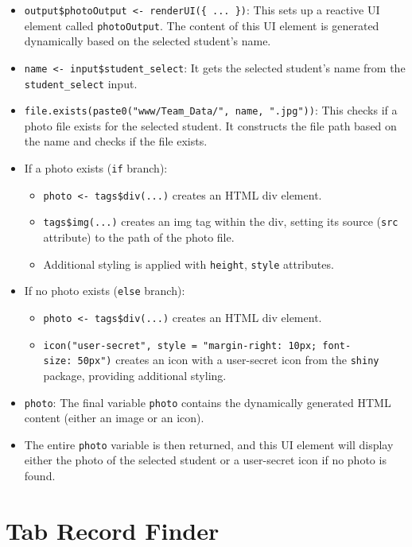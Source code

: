 \documentclass[
]{book}
\providecommand{\tightlist}{%
  \setlength{\itemsep}{0pt}\setlength{\parskip}{0pt}}
\begin{document}
\begin{itemize}
\item
  \texttt{output\$photoOutput\ \textless{}-\ renderUI(\{\ ...\ \})}: This sets up a reactive UI element called \texttt{photoOutput}. The content of this UI element is generated dynamically based on the selected student's name.
\item
  \texttt{name\ \textless{}-\ input\$student\_select}: It gets the selected student's name from the \texttt{student\_select} input.
\item
  \texttt{file.exists(paste0("www/Team\_Data/",\ name,\ ".jpg"))}: This checks if a photo file exists for the selected student. It constructs the file path based on the name and checks if the file exists.
\item
  If a photo exists (\texttt{if} branch):

  \begin{itemize}
  \tightlist
  \item
    \texttt{photo\ \textless{}-\ tags\$div(...)} creates an HTML div element.
  \item
    \texttt{tags\$img(...)} creates an img tag within the div, setting its source (\texttt{src} attribute) to the path of the photo file.
  \item
    Additional styling is applied with \texttt{height}, \texttt{style} attributes.
  \end{itemize}
\item
  If no photo exists (\texttt{else} branch):

  \begin{itemize}
  \tightlist
  \item
    \texttt{photo\ \textless{}-\ tags\$div(...)} creates an HTML div element.
  \item
    \texttt{icon("user-secret",\ style\ =\ "margin-right:\ 10px;\ font-size:\ 50px")} creates an icon with a user-secret icon from the \texttt{shiny} package, providing additional styling.
  \end{itemize}
\item
  \texttt{photo}: The final variable \texttt{photo} contains the dynamically generated HTML content (either an image or an icon).
\item
  The entire \texttt{photo} variable is then returned, and this UI element will display either the photo of the selected student or a user-secret icon if no photo is found.
\end{itemize}

\hypertarget{tab-record-finder}{%
\section{Tab Record Finder}\label{tab-record-finder}}
\end{document}
